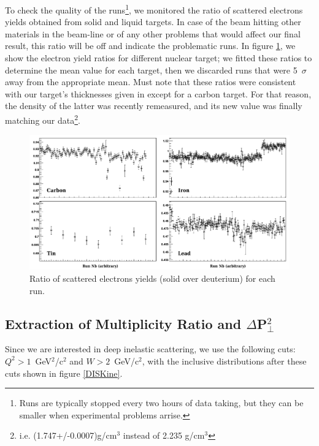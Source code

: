 To check the quality of the runs\footnote{Runs are typically stopped every two hours
of data taking, but they can be smaller when experimental problems arrise.}, we 
monitored the ratio of scattered electrons yields obtained from solid and liquid 
targets. In case of the beam hitting other materials in the beam-line or of any 
other problems that would affect our final result, 
this ratio will be off and indicate the problematic runs. In figure 
\ref{DataQ}, we show the electron yield ratios for different nuclear target; we 
fitted these ratios to determine the mean value for each target, then we discarded 
runs that were 5~$\sigma$ away from the appropriate mean. Must note that these 
ratios were consistent with our target's thicknesses given in \cite{Hakobyan:2008zz} 
except for a carbon target. For that reason, the density of the latter was 
recently remeasured, and its new value was finally matching our 
data\footnote{i.e. (1.747+/-0.0007)g/cm$^3$ instead of 2.235 g/cm$^3$}.

\begin{figure}[tbp]
\centering
\includegraphics[width=15cm] {chap5-fig/TargetElRatio.png}
\caption {Ratio of scattered electrons yields (solid over deuterium) for each run.}
\label{DataQ}
\end{figure}

\subsection{Extraction of Multiplicity Ratio and $\Delta$P$_\perp^2$}
\label{sec:obs}

Since we are interested in deep inelastic scattering, we use the following 
cuts: $Q^2 > 1$~GeV$^2$/c$^2$ and $W > 2$~GeV/c$^2$, with the inclusive distributions
after these cuts shown in figure \ref{DISKine}.


